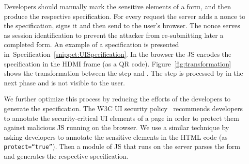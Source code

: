 Developers should manually mark the sensitive elements of a form, and then produce the respective specification.
For every request the server adds a nonce to the specification, signs it and then send to the user's browser. The nonce serves as session identification to prevent the attacker from re-submitting later a completed form.
An example of a specification is presented in~Specification~\ref{snippet:UISpecification}. 
In the browser the \name JS encodes the specification in the HDMI frame (as a QR code). 
Figure~\ref{fig:transformation} shows the transformation between the step \one and \two. The step \two is processed by \device in the next phase and is not visible to the user.

We further optimize this process by reducing the efforts of the developers to generate the specification. The W3C UI security policy~\cite{w3c_spec} recommends developers to annotate the security-critical UI elements of a page in order to protect them against malicious JS running on the browser. We use a similar technique by asking developers to annotate the sensitive elements in the HTML code (as \texttt{protect=``true''}). Then a module of \name JS that runs on the server parses the form and generates the respective specification.





